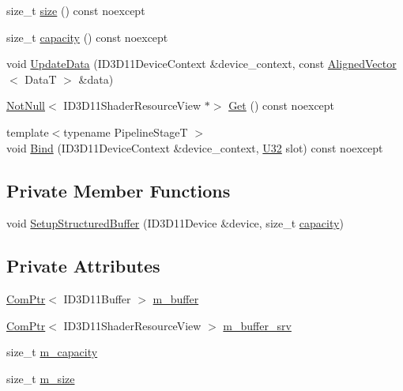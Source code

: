 \begin{DoxyCompactItemize}
\item 
size\+\_\+t \mbox{\hyperlink{classmage_1_1rendering_1_1_structured_buffer_ac51ac06740ae72d54a88d5d1b2f1a05d}{size}} () const noexcept
\item 
size\+\_\+t \mbox{\hyperlink{classmage_1_1rendering_1_1_structured_buffer_acbcdaebd04869e0248b8394c4823c433}{capacity}} () const noexcept
\item 
void \mbox{\hyperlink{classmage_1_1rendering_1_1_structured_buffer_af9d973d62ceefdcd7189c3b860f25b75}{Update\+Data}} (I\+D3\+D11\+Device\+Context \&device\+\_\+context, const \mbox{\hyperlink{namespacemage_a8664bfb5ce2179fc64eae9f82c8a5ba8}{Aligned\+Vector}}$<$ DataT $>$ \&data)
\item 
\mbox{\hyperlink{namespacemage_a8769f9d670d6b585ea306cb1062af94b}{Not\+Null}}$<$ I\+D3\+D11\+Shader\+Resource\+View $\ast$$>$ \mbox{\hyperlink{classmage_1_1rendering_1_1_structured_buffer_a7a2203f9542ac15f0053053d694d906c}{Get}} () const noexcept
\item 
{\footnotesize template$<$typename Pipeline\+StageT $>$ }\\void \mbox{\hyperlink{classmage_1_1rendering_1_1_structured_buffer_a46851d2fd8cb5efeda451bb90eaafb7a}{Bind}} (I\+D3\+D11\+Device\+Context \&device\+\_\+context, \mbox{\hyperlink{namespacemage_a41c104c036fba3756a74e19f793eeaa1}{U32}} slot) const noexcept
\end{DoxyCompactItemize}
\subsection*{Private Member Functions}
\begin{DoxyCompactItemize}
\item 
void \mbox{\hyperlink{classmage_1_1rendering_1_1_structured_buffer_aa8777c23aa6135e2d75a786df3937807}{Setup\+Structured\+Buffer}} (I\+D3\+D11\+Device \&device, size\+\_\+t \mbox{\hyperlink{classmage_1_1rendering_1_1_structured_buffer_acbcdaebd04869e0248b8394c4823c433}{capacity}})
\end{DoxyCompactItemize}
\subsection*{Private Attributes}
\begin{DoxyCompactItemize}
\item 
\mbox{\hyperlink{namespacemage_ae74f374780900893caa5555d1031fd79}{Com\+Ptr}}$<$ I\+D3\+D11\+Buffer $>$ \mbox{\hyperlink{classmage_1_1rendering_1_1_structured_buffer_a9bc484869ba3102e1e392438a2f3adeb}{m\+\_\+buffer}}
\item 
\mbox{\hyperlink{namespacemage_ae74f374780900893caa5555d1031fd79}{Com\+Ptr}}$<$ I\+D3\+D11\+Shader\+Resource\+View $>$ \mbox{\hyperlink{classmage_1_1rendering_1_1_structured_buffer_a07e3cc7dab6b293b084afb6b1fa8b035}{m\+\_\+buffer\+\_\+srv}}
\item 
size\+\_\+t \mbox{\hyperlink{classmage_1_1rendering_1_1_structured_buffer_a0251edd40d14732396952db2c0970fbf}{m\+\_\+capacity}}
\item 
size\+\_\+t \mbox{\hyperlink{classmage_1_1rendering_1_1_structured_buffer_a6985fe51dee8a1539994230f062a21ef}{m\+\_\+size}}
\end{DoxyCompactItemize}


